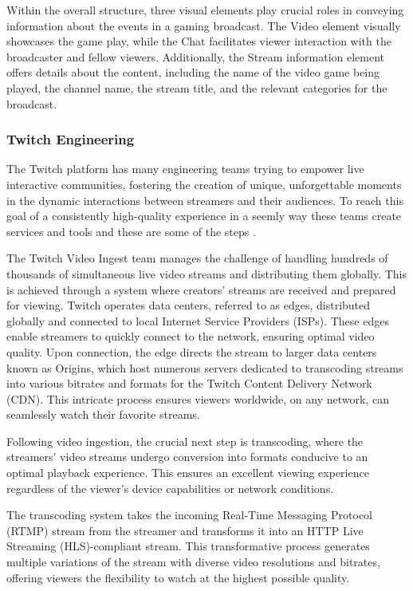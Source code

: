     Within the overall structure, three visual elements play crucial roles in conveying information about the events in a gaming broadcast. The Video element visually showcases the game play, while the Chat facilitates viewer interaction with the broadcaster and fellow viewers. Additionally, the Stream information element offers details about the content, including the name of the video game being played, the channel name, the stream title, and the relevant categories for the broadcast.

    \subsubsection*{Twitch Engineering}

    The Twitch platform has many engineering teams trying to empower live interactive communities, fostering the creation of unique, unforgettable moments in the dynamic interactions between streamers and their audiences. To reach this goal of a consistently high-quality experience in a seemly way these teams create services and tools and these are some of the steps \cite{TwitchEngineering}.

    The Twitch Video Ingest team manages the challenge of handling hundreds of thousands of simultaneous live video streams and distributing them globally. This is achieved through a system where creators' streams are received and prepared for viewing. Twitch operates data centers, referred to as edges, distributed globally and connected to local Internet Service Providers (ISPs). These edges enable streamers to quickly connect to the network, ensuring optimal video quality. Upon connection, the edge directs the stream to larger data centers known as Origins, which host numerous servers dedicated to transcoding streams into various bitrates and formats for the Twitch Content Delivery Network (CDN). This intricate process ensures viewers worldwide, on any network, can seamlessly watch their favorite streams.

    Following video ingestion, the crucial next step is transcoding, where the streamers' video streams undergo conversion into formats conducive to an optimal playback experience. This ensures an excellent viewing experience regardless of the viewer's device capabilities or network conditions.

    The transcoding system takes the incoming Real-Time Messaging Protocol (RTMP) stream from the streamer and transforms it into an HTTP Live Streaming (HLS)-compliant stream. This transformative process generates multiple variations of the stream with diverse video resolutions and bitrates, offering viewers the flexibility to watch at the highest possible quality.

